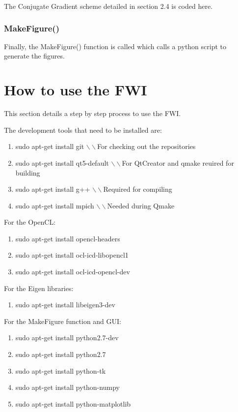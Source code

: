 \documentclass[10pt,a4paper]{article}
\begin{document}
The Conjugate Gradient scheme detailed in section 2.4 is coded here.

\subsubsection{MakeFigure()}

Finally, the MakeFigure() function is called which calls a python script to generate the figures.

\section{How to use the FWI}

This section details a step by step process to use the FWI. 


The development tools that need to be installed are:
\begin{enumerate}
    \item sudo apt-get install git  $\backslash\backslash$For checking out the repositories
    \item sudo apt-get install qt5-default  $\backslash\backslash$For QtCreator and qmake reuired for building
    \item sudo apt-get install g++   $\backslash\backslash$Required for compiling
    \item sudo apt-get install mpich   $\backslash\backslash$Needed during Qmake
\end{enumerate}

For the OpenCL:
\begin{enumerate}
    \item sudo apt-get install opencl-headers
    \item sudo apt-get install ocl-icd-libopencl1
    \item sudo apt-get install ocl-icd-opencl-dev
\end{enumerate}


For the Eigen libraries:
\begin{enumerate}
    \item sudo apt-get install libeigen3-dev
\end{enumerate}


For the MakeFigure function and GUI:

\begin{enumerate}
    \item sudo apt-get install python2.7-dev
    \item sudo apt-get install python2.7
    \item sudo apt-get install python-tk 
    \item sudo apt-get install python-numpy 
    \item sudo apt-get install python-matplotlib 
\end{enumerate}
\end{document}
